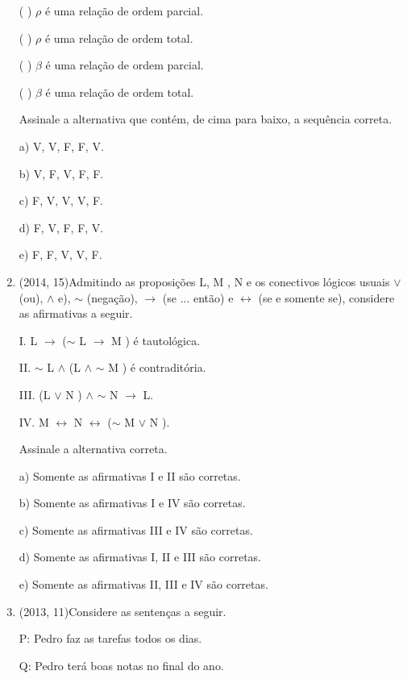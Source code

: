 \documentclass{article}
\begin{document}
\begin{enumerate}
( ) $\rho$ é uma relação de ordem parcial.

( ) $\rho$ é uma relação de ordem total.

( ) $\beta$ é uma relação de ordem parcial.

( ) $\beta$ é uma relação de ordem total.

Assinale a alternativa que contém, de cima para baixo, a sequência correta.

a) V, V, F, F, V.

b) V, F, V, F, F.

c) F, V, V, V, F.

d) F, V, F, F, V.

e) F, F, V, V, F.\newline







\item(2014, 15)Admitindo as proposições L, M , N e os conectivos lógicos usuais $\lor$ (ou), $\land$ e), $\sim$ (negação), $\rightarrow$ (se ... então) e $\leftrightarrow$ (se e somente se), considere as afirmativas a seguir.

I. L $\rightarrow$ ($\sim$ L $\rightarrow$ M ) é tautológica.

II. $\sim$ L $\land$ (L $\land$ $\sim$ M ) é contraditória.

III. (L $\lor$ N ) $\land$ $\sim$ N $\rightarrow$ L.

IV. M  $\leftrightarrow$ N  $\leftrightarrow$ ($\sim$ M $\lor$ N ).

Assinale a alternativa correta.

a) Somente as afirmativas I e II são corretas.

b) Somente as afirmativas I e IV são corretas.

c) Somente as afirmativas III e IV são corretas.

d) Somente as afirmativas I, II e III são corretas.

e) Somente as afirmativas II, III e IV são corretas.\newline








\item(2013, 11)Considere as sentenças a seguir.

P: Pedro faz as tarefas todos os dias.

Q: Pedro terá boas notas no final do ano.


\end{enumerate}
\end{document}
